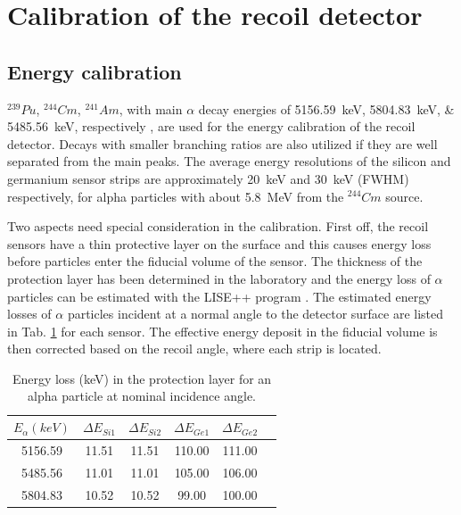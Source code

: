 \documentclass[number,5p]{elsarticle}
\begin{document}
\section{Calibration of the recoil detector}
\label{sec:calibration}

\subsection{Energy calibration}
\label{sec:energy_calibration}

\(^{239}Pu\), \(^{244}Cm\), \(^{241}Am\), with main $\alpha$ decay energies
of \SIlist{5156.59;5804.83;5485.56}{\keV}, respectively \cite{nuclear_data}, are
used for the energy calibration of the recoil detector.
Decays with smaller branching ratios are also utilized if they are well separated from the main peaks.
The average energy resolutions of the silicon and germanium
sensor strips are approximately \SI{20}{\keV} and \SI{30}{\keV} (FWHM)
respectively, for alpha particles with about \SI{5.8}{\MeV} from the $^{244}Cm$ source.

Two aspects need special consideration in the calibration.
First off, the recoil sensors have a thin protective layer on the surface and this
causes energy loss before particles enter the fiducial volume of the sensor.
The thickness of the protection layer has been determined in the laboratory
\cite{recoil_article} and the energy loss of $\alpha$ particles can be estimated
with the LISE++ program \cite{LISE}.
The estimated energy losses of $\alpha$ particles incident at a normal angle to
the detector surface are listed in Tab. \ref{tab:dead_layer} for each sensor.
The effective energy deposit in the fiducial volume is then corrected based on the recoil angle, where each strip is located.
\begin{table}[h!]
  \centering
  \caption{Energy loss (\si{\keV}) in the protection layer for an alpha particle
    at nominal incidence angle.}
  \label{tab:dead_layer}
  \begin{tabular}{cccccc}
    \hline
    \(E_{\alpha} (keV)\) & \(\Delta E_{Si1}\) & \(\Delta E_{Si2}\) & \(\Delta E_{Ge1}\) & \(\Delta E_{Ge2}\) \\
    \hline
    5156.59 & 11.51 & 11.51 & 110.00 & 111.00 \\
    5485.56 & 11.01 & 11.01 & 105.00 & 106.00 \\
    5804.83 & 10.52 & 10.52 & 99.00  & 100.00 \\
    \hline
  \end{tabular}
\end{table}
\end{document}

